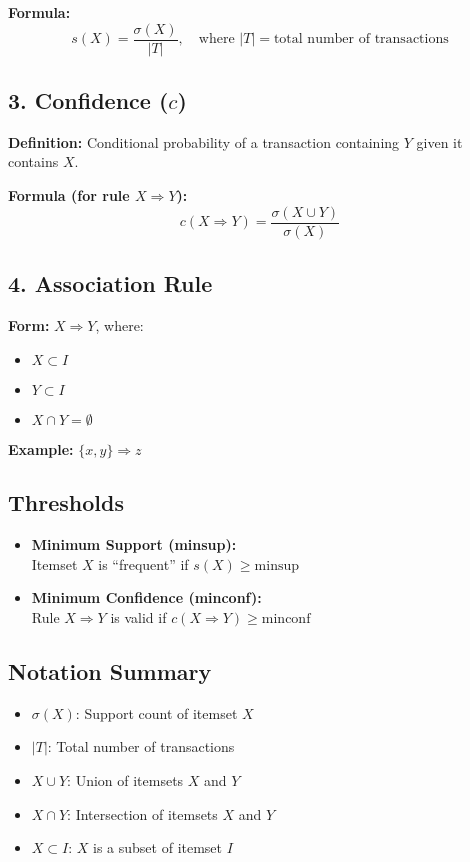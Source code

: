 \documentclass[a4paper,10pt]{article}
\begin{document}
\textbf{Formula:}
\[
s(X) = \frac{\sigma(X)}{|T|}, \quad \text{where } |T| = \text{total number of transactions}
\]

\vspace{1cm}

\subsection*{3. Confidence ($c$)}
\textbf{Definition:} Conditional probability of a transaction containing \(Y\) given it contains \(X\).

\textbf{Formula (for rule $X \Rightarrow Y$):}
\[
c(X \Rightarrow Y) = \frac{\sigma(X \cup Y)}{\sigma(X)}
\]

\vspace{1cm}

\subsection*{4. Association Rule}
\textbf{Form:} \(X \Rightarrow Y\), where:
\begin{itemize}
    \item \(X \subset I\)
    \item \(Y \subset I\)
    \item \(X \cap Y = \emptyset\)
\end{itemize}

\textbf{Example:} \(\{x,y\} \Rightarrow z\)

\vspace{1cm}

\subsection*{Thresholds}
\begin{itemize}
    \item \textbf{Minimum Support (minsup):}\\
          Itemset \(X\) is ``frequent'' if \(s(X) \geq \text{minsup}\)
    \vspace{0.3cm}
    \item \textbf{Minimum Confidence (minconf):}\\
          Rule \(X \Rightarrow Y\) is valid if \(c(X \Rightarrow Y) \geq \text{minconf}\)
\end{itemize}

\vspace{1cm}

\subsection*{Notation Summary}
\begin{itemize}
    \item \(\sigma(X)\): Support count of itemset \(X\)
    \item \(|T|\): Total number of transactions
    \item \(X \cup Y\): Union of itemsets \(X\) and \(Y\)
    \item \(X \cap Y\): Intersection of itemsets \(X\) and \(Y\)
    \item \(X \subset I\): \(X\) is a subset of itemset \(I\)
\end{itemize}
\end{document}
